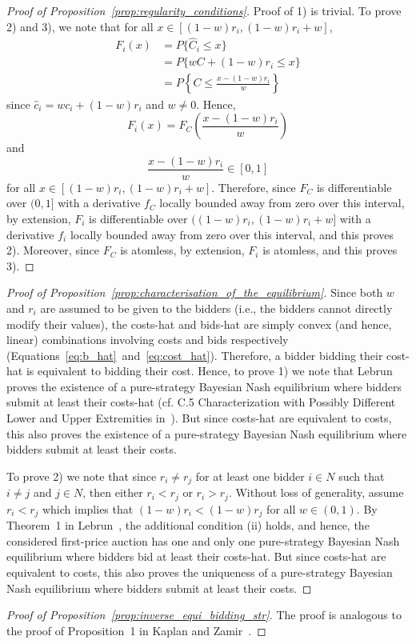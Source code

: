 \begin{proof}[Proof of Proposition~\ref{prop:regularity_conditions}]
Proof of 1) is trivial. To prove 2) and 3), we note that for all $x\in [(1-w)r_i, (1-w)r_i + w]$,
\begin{align*}
  F_i(x)
  &= P\{\hat{C}_i\le x\} \\
  &= P\{wC + (1-w)r_i\le x\} \\
  &= P\left\{ C\le \frac{x - (1-w)r_i}{w} \right\}
\end{align*}
since $\hat{c}_i = wc_i + (1-w)r_i$ and $w\neq 0$. Hence,
\begin{equation*}
  F_i(x) = F_C\left( \frac{x - (1-w)r_i}{w} \right)
\end{equation*}
and
\begin{equation*}
  \frac{x - (1-w)r_i}{w}\in [0,1]
\end{equation*}
for all $x\in [(1-w)r_i, (1-w)r_i + w]$. Therefore, since $F_C$ is differentiable over $(0,1]$ with a derivative $f_C$ locally bounded away from zero over this interval, by extension, $F_i$ is differentiable over $((1-w)r_i, (1-w)r_i + w]$ with a derivative $f_i$ locally bounded away from zero over this interval, and this proves 2). Moreover, since $F_C$ is atomless, by extension, $F_i$ is atomless, and this proves 3).
\end{proof}

\begin{proof}[Proof of Proposition~\ref{prop:characterisation_of_the_equilibrium}]
Since both $w$ and $r_i$ are assumed to be given to the bidders (i.e., the bidders cannot directly modify their values), the costs-hat and bids-hat are simply convex (and hence, linear) combinations involving costs and bids respectively (Equations~\eqref{eq:b_hat}~and~\eqref{eq:cost_hat}). Therefore, a bidder bidding their cost-hat is equivalent to bidding their cost. Hence, to prove 1) we note that Lebrun~\cite{Lebrun2006} proves the existence of a pure-strategy Bayesian Nash equilibrium where bidders submit at least their costs-hat (cf. C.5 Characterization with Possibly Different Lower and Upper Extremities in~\cite{Lebrun2006}). But since costs-hat are equivalent to costs, this also proves the existence of a pure-strategy Bayesian Nash equilibrium where bidders submit at least their costs.

To prove 2) we note that since $r_i\neq r_j$ for at least one bidder $i\in N$ such that $i\neq j$ and $j\in N$, then either $r_i < r_j$ or $r_i > r_j$. Without loss of generality, assume $r_i < r_j$ which implies that $(1-w)r_i < (1-w)r_j$ for all $w\in (0,1)$. By Theorem~1 in Lebrun~\cite{Lebrun2006}, the additional condition (ii) holds, and hence, the considered first-price auction has one and only one pure-strategy Bayesian Nash equilibrium where bidders bid at least their costs-hat. But since costs-hat are equivalent to costs, this also proves the uniqueness of a pure-strategy Bayesian Nash equilibrium where bidders submit at least their costs.
\end{proof}

\begin{proof}[Proof of Proposition~\ref{prop:inverse_equi_bidding_str}]
The proof is analogous to the proof of Proposition~1 in Kaplan and Zamir~\cite{KaplanZamir2007}.
\end{proof}

